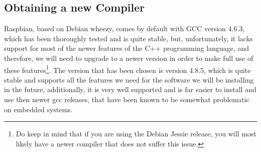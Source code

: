 \documentclass[]{article}
\begin{document}
                                                                                                                    \subsection{Obtaining a new Compiler}
                                                                                                                    Raspbian, based on Debian wheezy, comes by default with GCC version 4.6.3, which has been thoroughly tested 
                                                                                                                    and is quite stable, but, unfortunately, it lacks support for most of the newer features of the C++ 
                                                                                                                    programming language, and therefore, we will need to upgrade to a newer version in order to make full 
                                                                                                                    use of these features\footnote{Do keep in mind that if you are using the Debian Jessie release, you will 
                                                                                                                        most likely have a newer compiler that does not suffer this issue.}. The version that has been chosen is
                                                                                                                        version 4.8.5, which is quite stable and supports all the features we need for the software we will be
                                                                                                                        installing in the future, additionally, it is very well supported and is far easier to install and use then
                                                                                                                        newer gcc releases, that have been known to be somewhat problematic on embedded systems.
\end{document}
